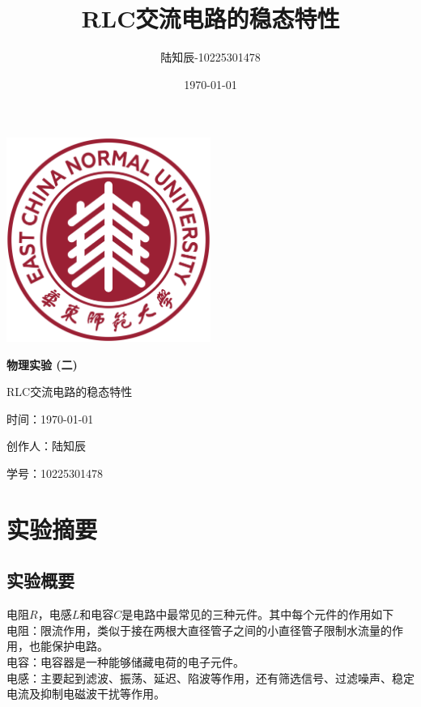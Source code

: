\documentclass{ctexart}
\title{RLC交流电路的稳态特性}
\author{陆知辰-10225301478}
\date{\today}
\begin{document}
\begin{titlepage}
  \centering
  \includegraphics[width=0.5\textwidth]{ecnu.png}
  
  \vspace*{\baselineskip}
  
  \Huge\textbf{物\quad 理\quad 实\quad 验 \quad (二)}
  \vspace*{0.3\baselineskip}
  
  \huge RLC交流电路的稳态特性
  
  \vspace*{2\baselineskip}
  
  \large 时间：\today
  
  \vspace*{\baselineskip}
  
  \large 创作人：陆知辰
  
  \vspace*{\baselineskip}
  
  \large 学号：10225301478
  
\end{titlepage}
\newpage
\tableofcontents
\newpage
\section{实验摘要}
  \subsection{实验概要}
  电阻$R$，电感$L$和电容$C$是电路中最常见的三种元件。其中每个元件的作用如下\\
  电阻：限流作用，类似于接在两根大直径管子之间的小直径管子限制水流量的作用，也能保护电路。\\
  电容：电容器是一种能够储藏电荷的电子元件。\\
  电感：主要起到滤波、振荡、延迟、陷波等作用，还有筛选信号、过滤噪声、稳定电流及抑制电磁波干扰等作用。\\
\end{document}
